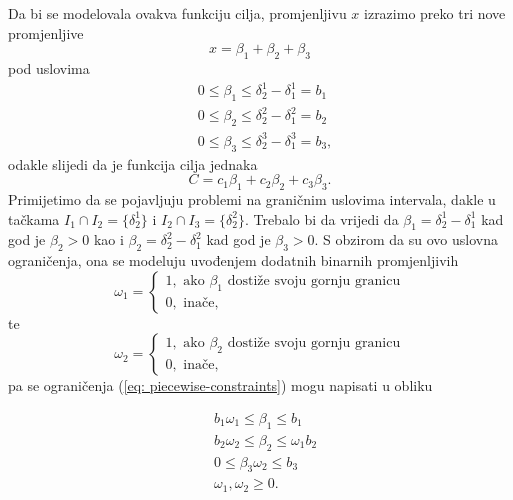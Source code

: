 \documentclass[a4paper, utf8, 11pt, colorlinks]{book}
\theoremstyle{definition}
\begin{document}
Da bi se modelovala ovakva funkciju cilja, promjenljivu $x$ izrazimo preko tri nove promjenljive 
$$x = \beta_1 + \beta_2 + \beta_3$$
pod uslovima 
\begin{align}
     &0   \leq \beta_1 \leq \delta^1_2 - \delta^1_1 = b_1 \nonumber \\
     &0  \leq \beta_2 \leq \delta^2_2 - \delta^2_1 = b_2 \nonumber \\
     &0  \leq \beta_3 \leq \delta^3_2- \delta^3_1 = b_3, \label{eq: piecewise-constraints}
\end{align}
odakle slijedi da je funkcija cilja   jednaka 
$$ C = c_1 \beta_1 + c_2 \beta_2 + c_3 \beta_3.$$ 
Primijetimo da se pojavljuju problemi na graničnim uslovima intervala, dakle u tačkama $I_1 \cap I_2 =\{\delta^1_2\}$ i $I_2 \cap I_3 =\{\delta^2_2\}$. Trebalo bi da vrijedi da $\beta_1 =  \delta^1_2 - \delta^1_1$ kad god je $\beta_2  > 0$ kao i $\beta_2 =  \delta^2_2 - \delta^2_1$ kad god je $\beta_3  > 0$.  S obzirom da su ovo uslovna ograničenja, ona se modeluju uvođenjem dodatnih binarnih promjenljivih 
$$ \omega_1 = \begin{cases}
                   1, \mbox{ ako } \beta_1 \mbox{ dostiže svoju gornju granicu} \\
                   0, \mbox{ inače},
              \end{cases}$$
te 
$$ \omega_2 = \begin{cases}
                   1, \mbox{ ako } \beta_2 \mbox{ dostiže svoju gornju granicu} \\
                   0, \mbox{ inače}, 
              \end{cases}$$
pa se ograničenja (\ref{eq: piecewise-constraints}) mogu napisati u obliku

\begin{align}
     & b_1 \omega_1 \leq \beta_1 \leq b_1   \nonumber \\
     & b_2 \omega_2 \leq \beta_2 \leq \omega_1 b_2 \nonumber \\
     & 0 \leq \beta_3  \omega_2 \leq b_3\nonumber \\
     & \omega_1, \omega_2 \geq 0. \label{eq: piecewise-constraints-equivalent}
\end{align}
\end{document}
